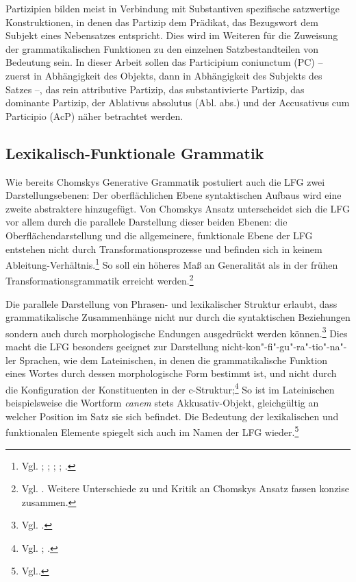 \documentclass[12pt,a4paper]{article}
\begin{document}
Partizipien bilden meist in Verbindung mit Substantiven spezifische satzwertige Konstruktionen, in denen das Partizip dem Prädikat, das Bezugswort dem Subjekt eines Nebensatzes entspricht. Dies wird im Weiteren für die Zuweisung der grammatikalischen Funktionen zu den einzelnen Satzbestandteilen von Bedeutung sein.
In dieser Arbeit sollen das Participium coniunctum (PC) -- zuerst in Abhängigkeit des Objekts, dann in Abhängigkeit des Subjekts des Satzes --, das rein attributive Partizip, das substantivierte Partizip, das dominante Partizip, der Ablativus absolutus (Abl. abs.) und der Accusativus cum Participio (AcP) näher betrachtet werden.

\subsection{Lexikalisch-Funktionale Grammatik}
Wie bereits Chomskys Generative Grammatik postuliert auch die LFG zwei Darstellungsebenen: Der oberflächlichen Ebene syntaktischen Aufbaus wird eine zweite abstraktere hinzugefügt. Von Chomskys Ansatz unterscheidet sich die LFG vor allem durch die parallele Darstellung dieser beiden Ebenen: die Oberflächendarstellung und die allgemeinere, funktionale Ebene der LFG entstehen nicht durch Transformationsprozesse und befinden sich in keinem Ableitung-Verhältnis.\footnote{Vgl. \cite[64]{Falk}; \cite[8]{Skript}; \cite[2; 4; 7]{Dal}; \cite[3-4]{Bresnan}; \cite[11; 13]{Rohrer}.} So soll ein höheres Maß an Generalität als in der frühen Transformationsgrammatik erreicht werden.\footnote{Vgl. \cite[1-3; 9]{Dal}. Weitere Unterschiede zu und Kritik an Chomskys Ansatz fassen \cite[11]{Rohrer} konzise zusammen.}

Die parallele Darstellung von Phrasen- und lexikalischer Struktur erlaubt, dass grammatikalische Zusammenhänge nicht nur durch die syntaktischen Beziehungen sondern auch durch morphologische Endungen ausgedrückt werden können.\footnote{Vgl. \cite[10; 14]{Bresnan}.} Dies macht die LFG besonders geeignet zur Darstellung nicht-kon"-fi"-gu"-ra"-tio"-na"-ler Sprachen, wie dem Lateinischen, in denen die grammatikalische Funktion eines Wortes durch dessen morphologische Form bestimmt ist, und nicht durch die Konfiguration der Konstituenten in der c-Struktur;\footnote{Vgl. \cite[19]{Rohrer}; \cite[65]{Dal}.} So ist im Lateinischen beispielsweise die Wortform \textit{canem} stets Akkusativ-Objekt, gleichgültig an welcher Position im Satz sie sich befindet. Die Bedeutung der lexikalischen und funktionalen Elemente spiegelt sich auch im Namen der LFG wieder.\footnote{Vgl.\cite[3]{Dal}.}
\end{document}
